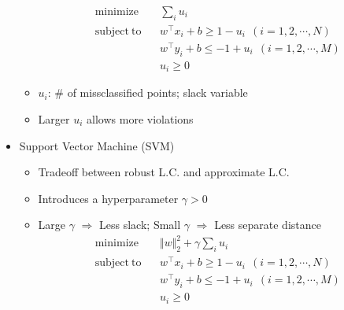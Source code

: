 \begin{itemize}
\begin{itemize}
\begin{equation}
\begin{aligned}
            \mathrm{minimize}~~&~~\sum_{i}u_i \\
            \mathrm{subject~to}~~&~~w^{\top}x_i+b\geq1-u_i~~(i=1,2,\cdots,N) \\
                &~~w^{\top}y_i+b\leq-1+u_i~~(i=1,2,\cdots,M) \\
                &~~u_i\geq 0
        \end{aligned}\end{equation}
        \item $u_i$: \# of missclassified points; slack variable
        \item Larger $u_i$ allows more violations
    \end{itemize}
    \item Support Vector Machine (SVM)
    \begin{itemize}
        \item Tradeoff between robust L.C. and approximate L.C.
        \item Introduces a hyperparameter $\gamma>0$
        \item Large $\gamma$ $\Rightarrow$ Less slack; Small $\gamma$ $\Rightarrow$ Less separate distance
        \begin{equation}\begin{aligned}
            \mathrm{minimize}~~&~~\Vert w\Vert_2^2+\gamma\sum_{i}u_i \\
            \mathrm{subject~to}~~&~~w^{\top}x_i+b\geq1-u_i~~(i=1,2,\cdots,N) \\
                &~~w^{\top}y_i+b\leq-1+u_i~~(i=1,2,\cdots,M) \\
                &~~u_i\geq0
        \end{aligned}\end{equation}
    \end{itemize}
\end{itemize}
\begin{figures}
\end{figures}

